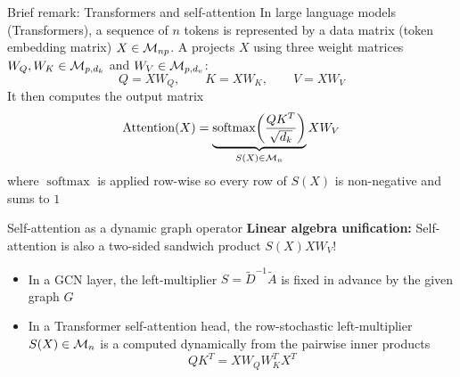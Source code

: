 \documentclass[aspectratio=169]{beamer}\usepackage[]{graphicx}\usepackage[]{xcolor}
\begin{document}
\begin{frame}{Brief remark: Transformers and self-attention}
In large language models (Transformers), a sequence of $n$ tokens is represented by a data matrix (token embedding matrix) $X \in \mathcal{M}_{np}$.
A  projects $X$ using three weight matrices $W_Q, W_K \in \mathcal{M}_{p, d_k}$ and $W_V \in \mathcal{M}_{p, d_v}$:
\[
Q = X W_Q, \qquad K = X W_K, \qquad V = X W_V
\]
\vfill
It then computes the output matrix
\[
\operatorname{Attention}(X) = \underbrace{\operatorname{softmax}\!\left(\frac{Q K^T}{\sqrt{d_k}}\right)}_{S(X) \in \mathcal{M}_n} X W_V
\]
where $\operatorname{softmax}$ is applied row-wise so every row of $S(X)$ is non-negative and sums to $1$
\end{frame}


\begin{frame}{Self-attention as a dynamic graph operator}
\textbf{Linear algebra unification:} Self-attention is also a two-sided sandwich product $S(X) X W_V$!
\vfill
\begin{itemize}
\item In a GCN layer, the left-multiplier $S = \tilde{D}^{-1}\tilde{A}$ is fixed in advance by the given graph $G$
\vfill
\item In a Transformer self-attention head, the row-stochastic left-multiplier $S(X) \in \mathcal{M}_n$ is a  computed dynamically from the pairwise inner products
\[
Q K^T = X W_Q W_K^T X^T
\]
\end{itemize}
\end{frame}
\end{document}
